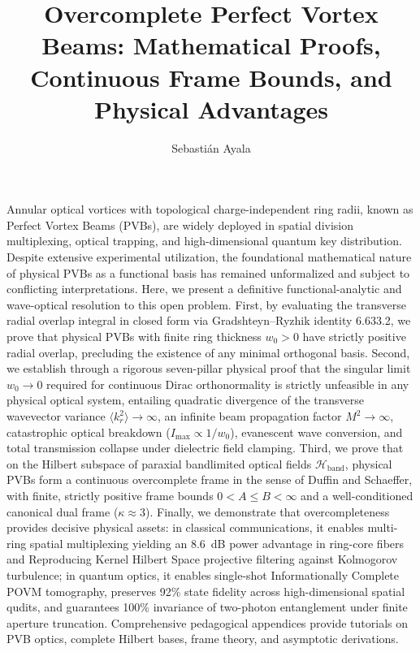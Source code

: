 \documentclass{optica-article}
\begin{document}
\title{Overcomplete Perfect Vortex Beams: Mathematical Proofs, Continuous Frame Bounds, and Physical Advantages}

\author{Sebastián Ayala}

\address{Investigador Independiente / Independent Researcher, Cauquenes, Regi{\'o}n del Maule, Chile}


\begin{abstract*}
Annular optical vortices with topological charge-independent ring radii, known as Perfect Vortex Beams (PVBs), are widely deployed in spatial division multiplexing, optical trapping, and high-dimensional quantum key distribution. Despite extensive experimental utilization, the foundational mathematical nature of physical PVBs as a functional basis has remained unformalized and subject to conflicting interpretations. Here, we present a definitive functional-analytic and wave-optical resolution to this open problem. First, by evaluating the transverse radial overlap integral in closed form via Gradshteyn--Ryzhik identity 6.633.2, we prove that physical PVBs with finite ring thickness $w_0 > 0$ have strictly positive radial overlap, precluding the existence of any minimal orthogonal basis. Second, we establish through a rigorous seven-pillar physical proof that the singular limit $w_0 \to 0$ required for continuous Dirac orthonormality is strictly unfeasible in any physical optical system, entailing quadratic divergence of the transverse wavevector variance $\langle k_r^2 \rangle \to \infty$, an infinite beam propagation factor $M^2 \to \infty$, catastrophic optical breakdown ($I_{\max} \propto 1/w_0$), evanescent wave conversion, and total transmission collapse under dielectric field clamping. Third, we prove that on the Hilbert subspace of paraxial bandlimited optical fields $\mathcal{H}_{\text{band}}$, physical PVBs form a continuous overcomplete frame in the sense of Duffin and Schaeffer, with finite, strictly positive frame bounds $0 < A \le B < \infty$ and a well-conditioned canonical dual frame ($\kappa \approx 3$). Finally, we demonstrate that overcompleteness provides decisive physical assets: in classical communications, it enables multi-ring spatial multiplexing yielding an 8.6~dB power advantage in ring-core fibers and Reproducing Kernel Hilbert Space projective filtering against Kolmogorov turbulence; in quantum optics, it enables single-shot Informationally Complete POVM tomography, preserves 92\% state fidelity across high-dimensional spatial qudits, and guarantees 100\% invariance of two-photon entanglement under finite aperture truncation. Comprehensive pedagogical appendices provide tutorials on PVB optics, complete Hilbert bases, frame theory, and asymptotic derivations.
\end{abstract*}
\end{document}
